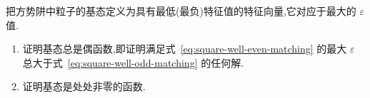 \begin{exercise}\label{ex:square-well-ground-state}
把方势阱中粒子的基态定义为具有最低(最负)特征值的特征向量,它对应于最大的 \(\varepsilon\) 值.
\begin{enumerate}
\item 证明基态总是偶函数,即证明满足式~\eqref{eq:square-well-even-matching} 的最大 \(\varepsilon\) 总大于式~\eqref{eq:square-well-odd-matching} 的任何解.
\item 证明基态是处处非零的函数.
\end{enumerate}
\end{exercise}
